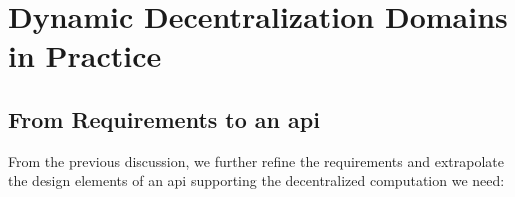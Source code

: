 \section{Dynamic Decentralization Domains in Practice}\label{sec:contrib}

\subsection{From Requirements to an \ac{api}}
\label{ssec:reqs-to-api}

From the previous discussion,
we further refine the
requirements and extrapolate the design elements of an \ac{api}
supporting the decentralized computation we need:
%

